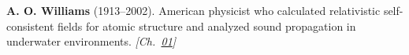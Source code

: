 \textbf{A. O. Williams} (1913–2002). American physicist who calculated relativistic self-consistent fields for atomic structure and analyzed sound propagation in underwater environments. \emph{[Ch.~\hyperref[ch:goldrelativity]{01}]}

